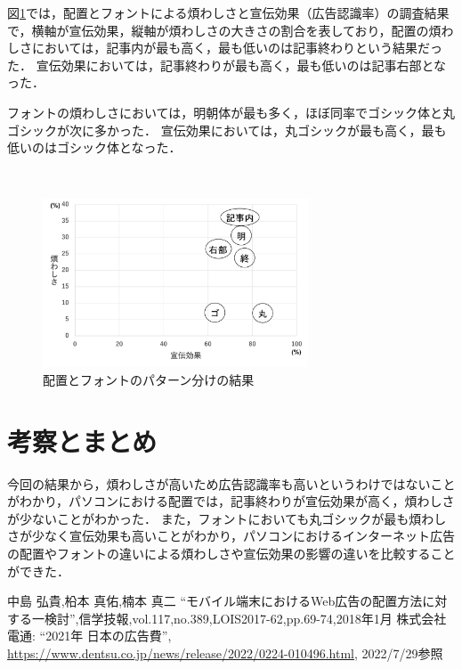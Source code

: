 \documentclass[twocolumn,10pt,a4j]{ltjsarticle}
\begin{document}
図\ref{fig:結果}では，配置とフォントによる煩わしさと宣伝効果（広告認識率）の調査結果で，横軸が宣伝効果，縦軸が煩わしさの大きさの割合を表しており，配置の煩わしさにおいては，記事内が最も高く，最も低いのは記事終わりという結果だった．
宣伝効果においては，記事終わりが最も高く，最も低いのは記事右部となった．

フォントの煩わしさにおいては，明朝体が最も多く，ほぼ同率でゴシック体と丸ゴシックが次に多かった．
宣伝効果においては，丸ゴシックが最も高く，最も低いのはゴシック体となった．

　
\begin{figure}[h]
\begin{center}
 \includegraphics[height=50mm]{結果.png}
\end{center}
 \caption{配置とフォントのパターン分けの結果}
 \label{fig:結果}
\end{figure}

\section{考察とまとめ}
今回の結果から，煩わしさが高いため広告認識率も高いというわけではないことがわかり，パソコンにおける配置では，記事終わりが宣伝効果が高く，煩わしさが少ないことがわかった．
また，フォントにおいても丸ゴシックが最も煩わしさが少なく宣伝効果も高いことがわかり，パソコンにおけるインターネット広告の配置やフォントの違いによる煩わしさや宣伝効果の影響の違いを比較することができた．

\begin{thebibliography}{99}
 中島 弘貴,柗本 真佑,楠本 真二 ``モバイル端末におけるWeb広告の配置方法に対する一検討'',信学技報,vol.117,no.389,LOIS2017-62,pp.69-74,2018年1月
 株式会社電通: ``2021年 日本の広告費'', \url{https://www.dentsu.co.jp/news/release/2022/0224-010496.html}, 2022/7/29参照
\end{thebibliography}
\end{document}
